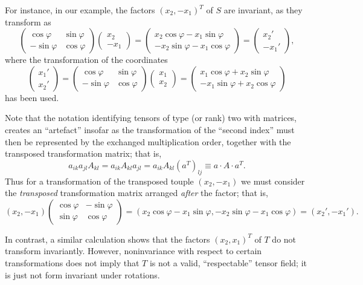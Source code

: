 {For instance, in our example, the factors $\left(    {  x}_2 ,- {  x}_1  \right)^T$
of $S$ are invariant, as they transform as
$$
\begin{pmatrix} \cos \varphi & \sin \varphi  \\
                         -\sin \varphi & \cos \varphi
\end{pmatrix}
\begin{pmatrix}
{  x}_2  \\
 - {  x}_1
\end{pmatrix}
=
\begin{pmatrix}
 {  x}_2 \cos \varphi  - x_1 \sin \varphi  \\
            - x_2 \sin \varphi         - {  x}_1 \cos \varphi
\end{pmatrix}
=
\begin{pmatrix}
{  x}_2'  \\
 - {  x}_1'
\end{pmatrix},
$$
where the transformation of the coordinates
$$
\begin{pmatrix}
{  x}_1'  \\
  {  x}_2'
\end{pmatrix}
=
\begin{pmatrix}
 \cos \varphi & \sin \varphi  \\
   -\sin \varphi & \cos \varphi
\end{pmatrix}
\begin{pmatrix}
 {  x}_1  \\
 {  x}_2
\end{pmatrix}
=
\begin{pmatrix}
{  x}_1 \cos \varphi  + x_2 \sin \varphi  \\
- x_1 \sin \varphi         + {  x}_2 \cos \varphi
\end{pmatrix}
$$
has been used.


Note that  the notation identifying tensors of type (or rank) two with matrices,
creates an ``artefact'' insofar as the transformation of the ``second index'' must then be represented by
the exchanged multiplication order, together with the transposed transformation matrix;
that is,
$$
a_{ik}a_{jl}A_{kl}
=  a_{ik}A_{kl}a_{jl}
=  a_{ik}A_{kl}\left(a^T \right)_{lj}
\equiv a\cdot A\cdot a^T .
$$
Thus for a
transformation  of
the transposed touple  $\left(    {  x}_2 ,- {  x}_1  \right)$
we must consider the {\em transposed} transformation matrix arranged {\em after} the factor; that is,
$$
\left(   {  x}_2 , - {  x}_1 \right)
\begin{pmatrix}  \cos \varphi & -\sin \varphi  \\
  \sin \varphi & \cos \varphi
\end{pmatrix}
=
\left(
{  x}_2 \cos \varphi  - x_1 \sin \varphi ,
 - x_2 \sin \varphi         - {  x}_1 \cos \varphi
\right)
=
\left(
{  x}_2'  ,
 - {  x}_1'
\right).
$$



In contrast, a similar calculation shows that the factors
$\left(    {  x}_2 ,  {  x}_1  \right)^T$
of $T$ do not transform invariantly.
However, noninvariance with respect to certain transformations does not imply that
$T$ is not a valid, ``respectable'' tensor field; it is just not form invariant under rotations.
\eexample
}

